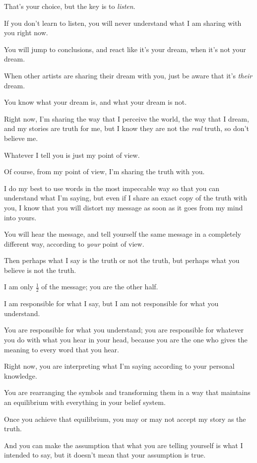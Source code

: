 \documentclass{article}
\numberwithin{equation}{section}
\begin{document}
That's your choice, but the key is to \textit{listen}.

%
If you don't learn to listen, you will never understand what I am sharing with you right now.

You will jump to conclusions, and react like it's your dream, when it's not your dream.

When other artists are sharing their dream with you, just be aware that it's \textit{their} dream.

You know what your dream is, and what your dream is not.

%
Right now, I'm sharing the way that I perceive the world, the way that I dream, and my stories are truth for me, but I know they are not the \textit{real} truth, so don't believe me.

Whatever I tell you is just my point of view.

Of course, from my point of view, I'm sharing the truth with you.

I do my best to use words in the most impeccable way so that you can understand what I'm saying, but even if I share an exact copy of the truth with you, I know that you will distort my message as soon as it goes from my mind into yours.

You will hear the message, and tell yourself the same message in a completely different way, according to \textit{your} point of view.

%
Then perhaps what I say is the truth or not the truth, but perhaps what you believe is not the truth.

I am only $\frac{1}{2}$ of the message; you are the other half.

I am responsible for what I say, but I am not responsible for what you understand.

You are responsible for what you understand; you are responsible for whatever you do with what you hear in your head, because you are the one who gives the meaning to every word that you hear.

%
Right now, you are interpreting what I'm saying according to your personal knowledge.

You are rearranging the symbols and transforming them in a way that maintains an equilibrium with everything in your belief system.

Once you achieve that equilibrium, you may or may not accept my story as the truth.

And you can make the assumption that what you are telling yourself is what I intended to say, but it doesn't mean that your assumption is true.
\end{document}

